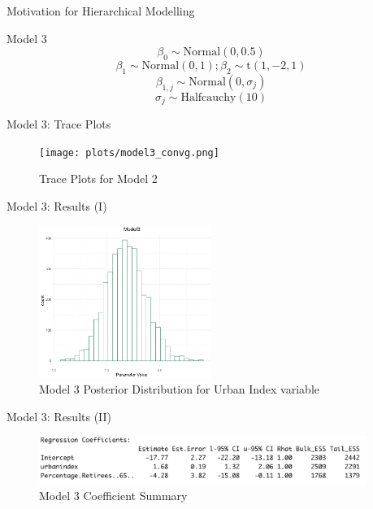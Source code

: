 \documentclass{beamer}
\begin{document}
\begin{frame}{Motivation for Hierarchical Modelling}
\begin{frame}{Model 3}
    \[\beta_0 \sim \text{Normal}(0, 0.5)\]
    \[\beta_1 \sim \text{Normal}(0, 1); \beta_2 \sim \text{t}(1,-2,1)\]
    \[\beta_{1,j} \sim \text{Normal}(0, \sigma_j)\]
    \[ \sigma_j \sim \text{Halfcauchy}(10)\]

\end{frame}

\begin{frame}{Model 3: Trace Plots}
    \begin{center}
        \begin{figure}
            \texttt{[image: plots/model3\_convg.png]}
            \caption{Trace Plots for Model 2}
        \end{figure}
    \end{center}
\end{frame}


\begin{frame}{Model 3: Results (I)}
    \begin{figure}
            \caption{Model 3 Posterior Distribution for Urban Index variable}
        \includegraphics[width=0.5\textwidth]{plots/model3_postui.png}
    \end{figure}

\end{frame}


\begin{frame}{Model 3: Results (II)}

    \begin{figure}
         \caption{Model 3 Coefficient Summary}
        \includegraphics[width=0.95\textwidth]{plots/model3_coeff.png}
    \end{figure}
\end{frame}



\end{frame}
\end{document}
